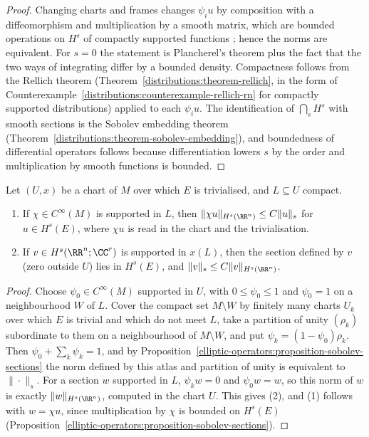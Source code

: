 \begin{proof}
Changing charts and frames changes $\psi_iu$ by composition with a diffeomorphism and multiplication by a smooth matrix, which are bounded operations on $H^s$ of compactly supported functions
\cite[Chapter 6]{warner-foundations}; hence the norms are equivalent. For $s = 0$ the statement is Plancherel's theorem plus the fact that the two ways of integrating differ by a bounded density. Compactness
follows from the Rellich theorem (Theorem~\ref{distributions:theorem-rellich}, in the form of Counterexample~\ref{distributions:counterexample-rellich-rn} for compactly supported distributions) applied to
each $\psi_iu$. The identification of $\bigcap_sH^s$ with smooth sections is the Sobolev embedding theorem (Theorem~\ref{distributions:theorem-sobolev-embedding}), and boundedness of differential operators
follows because differentiation lowers $s$ by the order and multiplication by smooth functions is bounded.
\end{proof}

\begin{lemma}\label{elliptic-operators:lemma-localisation}
Let $(U, x)$ be a chart of $M$ over which $E$ is trivialised, and $L \subseteq U$ compact.
\begin{enumerate}
\item If $\chi \in C^\infty(M)$ is supported in $L$, then $\|\chi u\|_{H^s(\RR^n)} \leq C\|u\|_s$ for $u \in H^s(E)$, where $\chi u$ is read in the chart and the trivialisation.
\item If $v \in H^s(\RR^n; \CC^r)$ is supported in $x(L)$, then the section defined by $v$ (zero outside $U$) lies in $H^s(E)$, and $\|v\|_s \leq C\|v\|_{H^s(\RR^n)}$.
\end{enumerate}
\end{lemma}

\begin{proof}
Choose $\psi_0 \in C^\infty(M)$ supported in $U$, with $0 \leq \psi_0 \leq 1$ and $\psi_0 = 1$ on a neighbourhood $W$ of $L$. Cover the compact set $M \setminus W$ by finitely many charts $U_k$ over which $E$ is trivial
and which do not meet $L$, take a partition of unity $(\rho_k)$ subordinate to them on a neighbourhood of $M \setminus W$, and put $\psi_k = (1 - \psi_0)\rho_k$. Then $\psi_0 + \sum_k\psi_k = 1$, and by
Proposition~\ref{elliptic-operators:proposition-sobolev-sections} the norm defined by this atlas and partition of unity is equivalent to $\|\cdot\|_s$. For a section $w$ supported in $L$, $\psi_kw = 0$ and $\psi_0w = w$,
so this norm of $w$ is exactly $\|w\|_{H^s(\RR^n)}$, computed in the chart $U$. This gives (2), and (1) follows with $w = \chi u$, since multiplication by $\chi$ is bounded on $H^s(E)$
(Proposition~\ref{elliptic-operators:proposition-sobolev-sections}).
\end{proof}

